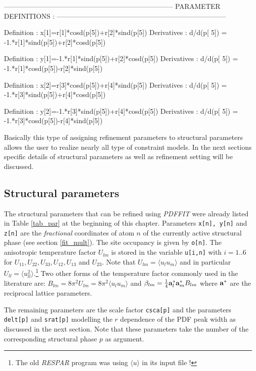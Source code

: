 \footnotesize
\begin{MacVerbatim}
     --------------------------------------------------------------------------
     PARAMETER DEFINITIONS :
     --------------------------------------------------------------------------

     Definition  : x[1]=r[1]*cosd(p[5])+r[2]*sind(p[5])
     Derivatives : d/d(p[   5]) = -1.*r[1]*sind(p[5])+r[2]*cosd(p[5])

     Definition  : y[1]=-1.*r[1]*sind(p[5])+r[2]*cosd(p[5])
     Derivatives : d/d(p[   5]) = -1.*r[1]*cosd(p[5])-r[2]*sind(p[5])

     Definition  : x[2]=r[3]*cosd(p[5])+r[4]*sind(p[5])
     Derivatives : d/d(p[   5]) = -1.*r[3]*sind(p[5])+r[4]*cosd(p[5])

     Definition  : y[2]=-1.*r[3]*sind(p[5])+r[4]*cosd(p[5])
     Derivatives : d/d(p[   5]) = -1.*r[3]*cosd(p[5])-r[4]*sind(p[5])
\end{MacVerbatim}
\normalsize

\noindent Basically this type of assigning refinement parameters
to structural parameters allows the user to realize nearly all
type of constraint models. In the next sections specific details
of structural parameters as well as refinement setting will be
discussed.

\subsection{Structural parameters \label{fit_stru}}

The structural parameters that can be refined using {\it PDFFIT}
were already listed in Table \ref{tab_par} at the beginning of
this chapter. Parameters {\tt x[n], y[n]} and {\tt z[n]} are the
{\it fractional} coordinates of atom $n$ of the currently active
structural phase (see section \ref{fit_mult}). The site occupancy
is given by {\tt o[n]}. The anisotropic temperature factor
$U_{lm}$ is stored in the variable {\tt u[i,n]} with $i=1..6$ for
$U_{11}, U_{22}, U_{33}, U_{12}, U_{13}$ and $U_{23}$. Note that
$U_{lm} = \langle u_{l}u_{m} \rangle$ and in particular $U_{ll} =
\langle u_{ll}^{2} \rangle$.\footnote{The old {\it RESPAR} program
was using $\langle u \rangle$ in its input file !} Two other forms
of the temperature factor commonly used in the literature are:
$B_{lm} = 8 \pi^{2}U_{lm} = 8 \pi^{2} \langle u_{l}u_{m} \rangle$
and $\beta_{lm} = \frac{1}{4} {\bf a}^{*}_{l} {\bf a}^{*}_{m}
B_{lm}$ where ${\bf a}^{*}$ are the reciprocal lattice parameters.
\par The remaining parameters are the scale factor {\tt csca[p]}
and the parameters {\tt delt[p]} and {\tt srat[p]} modelling the
$r$ dependence of the PDF peak width as discussed in the next
section. Note that these parameters take the number of the
corresponding structural phase $p$ as argument.

